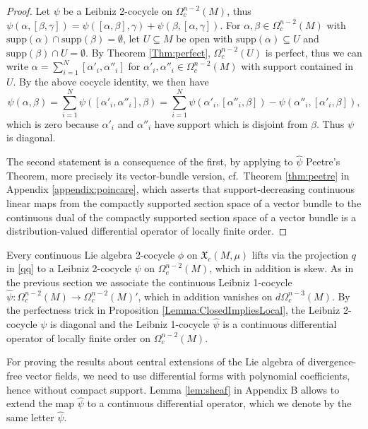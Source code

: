 \documentclass{article}
\newcommand{\fX}{\mathfrak{X}}
\newcommand{\supp}{\mathrm{supp}}
\theoremstyle{definition}
\begin{document}
\begin{proof}
Let $\psi$ be a Leibniz 2-cocycle on $\Omega_{c}^{n-2}(M)$, thus 
$\psi(\alpha,[\beta,\gamma])=\psi([\alpha,\beta],\gamma)+\psi(\beta,[\alpha,\gamma])$.
For $\alpha, \beta \in \Omega^{n-2}_{c}(M)$ with $\supp(\alpha) \cap \supp(\beta) = \emptyset$, let $U \subseteq M$ be open with 
$\supp(\alpha) \subseteq U$ and $\supp(\beta) \cap U = \emptyset$. 
By Theorem \ref{Thm:perfect}, $\Omega^{n-2}_{c}(U)$ is perfect, thus we can write $\alpha = \sum_{i=1}^{N} [\alpha'_i, \alpha''_i]$ for 
$\alpha'_i, \alpha''_i \in \Omega^{n-2}_{c}(M)$ with support contained in $U$. By the above cocycle identity, we then have
\begin{equation*}
\psi(\alpha,\beta) = \sum_{i=1}^{N} \psi([\alpha'_i, \alpha''_i],\beta)
 = \sum_{i=1}^{N}  \psi(\alpha'_i,[\alpha''_i,\beta])-\psi(\alpha''_i,[\alpha'_i ,\beta]) ,
\end{equation*}
which is zero because $\alpha'_i$ and $\alpha''_i$ have support which is disjoint from $\beta$. 
Thus $\psi$ is diagonal.

The second statement is a consequence of the first, by applying to $\widehat\psi$ Peetre's Theorem, more precisely its vector-bundle version, cf.\ Theorem \ref{thm:peetre} in Appendix \ref{appendix:poincare}, which asserts that support-decreasing continuous linear maps from the compactly supported section space of a vector bundle to the continuous dual of the compactly supported section space of a vector bundle is a distribution-valued differential operator of locally finite order.
\end{proof}


Every continuous Lie algebra 2-cocycle $\phi$ on $\fX_{c}(M,\mu)$ lifts via the projection $q$ in \eqref{qq} to a Leibniz 2-cocycle $\psi$ on $\Omega^{n-2}_{c}(M)$,
which in addition is skew. 
As in the previous section we associate the continuous Leibniz 1-cocycle $\widehat\psi:\Omega^{n-2}_{c}(M)\to\Omega^{n-2}_{c}(M)'$,
which in addition vanishes on $ d\Omega_{c}^{n-3}(M)$.
By the perfectness trick in Proposition \ref{Lemma:ClosedImpliesLocal}, the Leibniz 2-cocycle $\psi$ is diagonal and 
the Leibniz 1-cocycle $\widehat\psi$ is a continuous differential operator of locally finite order on $\Omega_{c}^{n-2}(M)$.


For proving the results about central extensions of the Lie algebra of divergence-free vector fields, we need to use differential forms with polynomial coefficients,
hence without compact support.
Lemma \ref{lem:sheaf} in Appendix B allows to extend the map $\widehat\psi$ to a continuous differential operator, which we denote by the same letter $\widehat\psi$.
\end{document}
